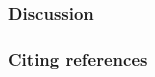 \documentclass{article}
\begin{document}
\subsubsection{Discussion}




\subsubsection{Citing references}




\end{document}
